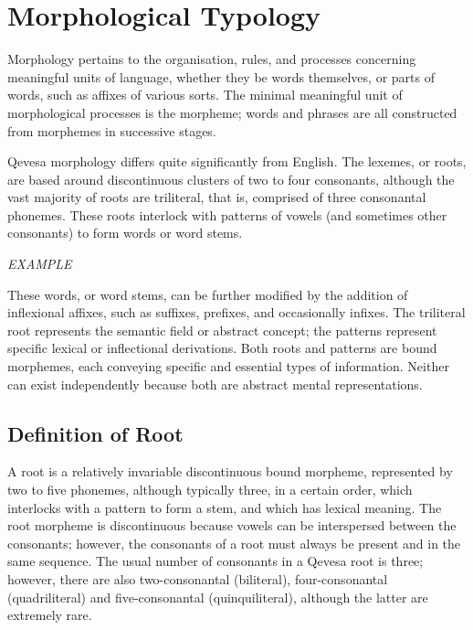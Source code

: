 \documentclass[grammar]{subfiles}
\begin{document}
	\chapter{Morphological Typology}
	\label{ch:morphological_typology}

	Morphology pertains to the organisation, rules, and processes concerning meaningful units of language, whether they be words themselves, or parts of words, such as affixes of various sorts. The minimal meaningful unit of morphological processes is the morpheme; words and phrases are all constructed from morphemes in successive stages.
	
	Qevesa morphology differs quite significantly from English. The lexemes, or roots, are based around discontinuous clusters of two to four consonants, although the vast majority of roots are triliteral, that is, comprised of three consonantal phonemes. These roots interlock with patterns of vowels (and sometimes other consonants) to form words or word stems.

	\begin{exe}
		\ex \emph{EXAMPLE}
	\end{exe}

	These words, or word stems, can be further modified by the addition of inflexional affixes, such as suffixes, prefixes, and occasionally infixes. The triliteral root represents the semantic field or abstract concept; the patterns represent specific lexical or inflectional derivations. Both roots and patterns are bound morphemes, each conveying specific and essential types of information. Neither can exist independently because both are abstract mental representations. 

	\section{Definition of Root}
	\label{sec:definition_of_root}

	A root is a relatively invariable discontinuous bound morpheme, represented by two to five phonemes, although typically three, in a certain order, which interlocks with a pattern to form a stem, and which has lexical meaning. The root morpheme is discontinuous because vowels can be interspersed between the consonants; however, the consonants of a root must always be present and in the same sequence. The usual number of consonants in a Qevesa root is three; however, there are also two-consonantal (biliteral), four-consonantal (quadriliteral) and five-consonantal (quinquiliteral), although the latter are extremely rare.
\end{document}
